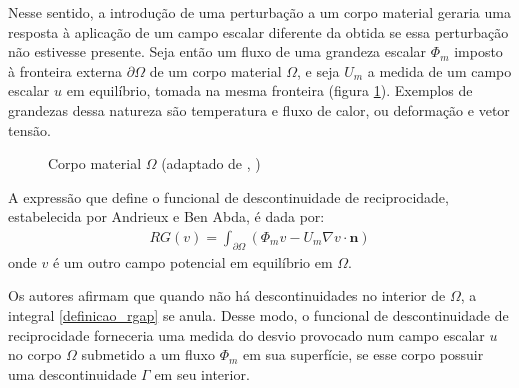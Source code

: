 Nesse sentido, a introdução de uma perturbação a um corpo material geraria uma resposta à aplicação de um campo escalar diferente da obtida se
essa perturbação não estivesse presente. Seja então um fluxo de uma grandeza escalar $\Phi_m$ imposto à fronteira externa $\partial\Omega$ de um corpo material
$\Omega$, e seja $U_m$ a medida de um campo escalar $u$ em equilíbrio, tomada na mesma fronteira (figura \ref{fig3}). Exemplos de grandezas dessa natureza são
temperatura e fluxo de calor, ou deformação e vetor tensão. 
\begin{figure}[h!b]
\begin{center}
\caption{Corpo material $\Omega$ (adaptado de \citeauthor{artigo_andrieux}, \citeyear{artigo_andrieux})}
\label{fig3}
\end{center}
\end{figure}

A expressão que define o funcional de descontinuidade de reciprocidade, estabelecida por Andrieux e Ben Abda, é dada por:
\begin{align}
	RG(v) = \int_{\partial\Omega} \left( \Phi_m v - U_m \nabla v \cdot \mathbf{n} \right) \label{definicao_rgap}
\end{align}
onde $v$ é um outro campo potencial em equilíbrio em $\Omega$.

Os autores afirmam que quando não há descontinuidades no interior de $\Omega$, a integral \eqref{definicao_rgap} se anula. Desse modo, o funcional de descontinuidade de reciprocidade
forneceria uma medida do desvio provocado num campo escalar $u$ no corpo $\Omega$ submetido a um fluxo $\Phi_m$ em sua superfície, se esse corpo
possuir uma descontinuidade $\Gamma$ em seu interior.

